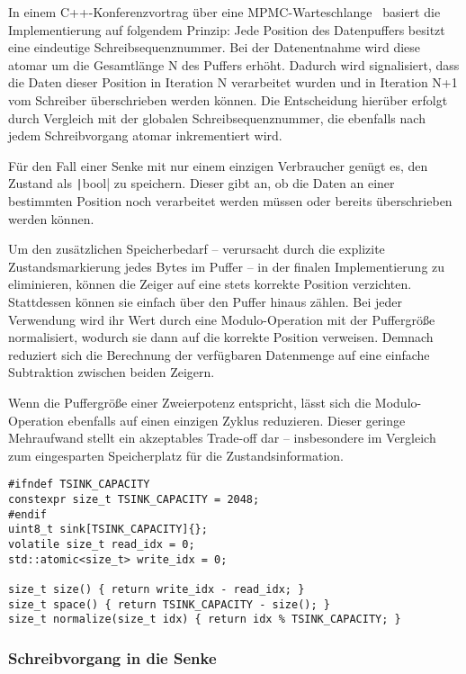 In einem C++-Konferenzvortrag über eine
\ac{MPMC}-Warteschlange~\cite{CppCon2024LockFreeQueue} basiert die
Implementierung auf folgendem Prinzip: Jede Position des Datenpuffers besitzt
eine eindeutige Schreibsequenznummer. Bei der Datenentnahme wird diese atomar um
die Gesamtlänge N des Puffers erhöht. Dadurch wird signalisiert, dass die Daten
dieser Position in Iteration N verarbeitet wurden und in Iteration N+1 vom
Schreiber überschrieben werden können. Die Entscheidung hierüber erfolgt durch
Vergleich mit der globalen Schreibsequenznummer, die ebenfalls nach jedem
Schreibvorgang atomar inkrementiert wird.

Für den Fall einer Senke mit nur einem einzigen Verbraucher genügt es, den
Zustand als \texttt|bool| zu speichern. Dieser gibt an, ob die Daten an
einer bestimmten Position noch verarbeitet werden müssen oder bereits
überschrieben werden können.

Um den zusätzlichen Speicherbedarf -- verursacht durch die explizite
Zustandsmarkierung jedes Bytes im Puffer -- in der finalen Implementierung zu
eliminieren, können die Zeiger auf eine stets korrekte Position verzichten.
Stattdessen können sie einfach über den Puffer hinaus zählen. Bei jeder
Verwendung wird ihr Wert durch eine Modulo-Operation mit der Puffergröße
normalisiert, wodurch sie dann auf die korrekte Position verweisen. Demnach
reduziert sich die Berechnung der verfügbaren Datenmenge auf eine einfache
Subtraktion zwischen beiden Zeigern.

Wenn die Puffergröße einer Zweierpotenz entspricht, lässt sich die
Modulo-Operation ebenfalls auf einen einzigen Zyklus reduzieren. Dieser geringe
Mehraufwand stellt ein akzeptables Trade-off dar -- insbesondere im Vergleich
zum eingesparten Speicherplatz für die Zustandsinformation.

\begin{code}
\begin{verbatim}
#ifndef TSINK_CAPACITY
constexpr size_t TSINK_CAPACITY = 2048;
#endif
uint8_t sink[TSINK_CAPACITY]{};
volatile size_t read_idx = 0;
std::atomic<size_t> write_idx = 0;

size_t size() { return write_idx - read_idx; }
size_t space() { return TSINK_CAPACITY - size(); }
size_t normalize(size_t idx) { return idx % TSINK_CAPACITY; }
\end{verbatim}
\end{code}

\subsubsection{Schreibvorgang in die Senke}

